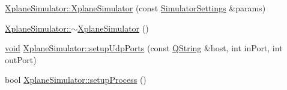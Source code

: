 \begin{DoxyCompactItemize}
\item 
\hyperlink{group___h_i_t_l_plugin_ga5832264c593dd9f80ac14145b83c28c9}{\-Xplane\-Simulator\-::\-Xplane\-Simulator} (const \hyperlink{group___h_i_t_l_plugin_ga052199f1328d3002bce3e45345aa7f4e}{\-Simulator\-Settings} \&params)
\item 
\hyperlink{group___h_i_t_l_plugin_ga0254db12886ca7e399e2d27fef9e185a}{\-Xplane\-Simulator\-::$\sim$\-Xplane\-Simulator} ()
\item 
\hyperlink{group___u_a_v_objects_plugin_ga444cf2ff3f0ecbe028adce838d373f5c}{void} \hyperlink{group___h_i_t_l_plugin_ga84ae33286060d1b0d834fa2b5f20e2fe}{\-Xplane\-Simulator\-::setup\-Udp\-Ports} (const \hyperlink{group___u_a_v_objects_plugin_gab9d252f49c333c94a72f97ce3105a32d}{\-Q\-String} \&host, int in\-Port, int out\-Port)
\item 
bool \hyperlink{group___h_i_t_l_plugin_ga3818193fd63bfaf004e3aab25491f28c}{\-Xplane\-Simulator\-::setup\-Process} ()
\end{DoxyCompactItemize}
